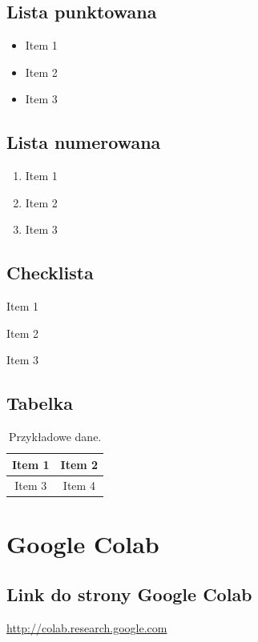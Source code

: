\documentclass{article}
\begin{document}
\subsection{Lista punktowana}
\begin{itemize}
    \item Item 1
    \item Item 2
    \item Item 3
\end{itemize}

\subsection{Lista numerowana}
\begin{enumerate}
    \item Item 1
    \item Item 2
    \item Item 3
\end{enumerate}

\subsection{Checklista}
\begin{todolist}
    \item Item 1
    \item Item 2
    \item Item 3
\end{todolist}

\subsection{Tabelka}
\begin{table}[h]
    \centering

    \begin{tabular}{c|c}
       \hline
       Item 1 & Item 2 \\
       \hline
       Item 3 & Item 4 \\
       \hline
    \end{tabular}

    \caption{Przykładowe dane.}
    \label{tab:data}
\end{table}

\section{Google Colab}

\subsection{Link do strony Google Colab}
\url{http://colab.research.google.com}
\end{document}
